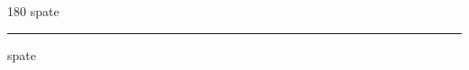 
\begin{frame}
\begin{center}
\begin{turn}{180}
{\fontsize{2.5cm}{1em}\selectfont spate}
\end{turn}
\vspace{1em}\par  
\hrule
\vspace{1em}\par  
{\fontsize{2.5cm}{1em}\selectfont spate}
\end{center}
\end{frame}
